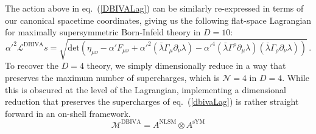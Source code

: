 \documentclass[12pt,letter]{article}
\def\eqn#1{eq.~(\ref{#1})}
\def\be{\begin{equation}}
\def\ee{\end{equation}}
\begin{document}
The action above in \eqn{DBIVALag} can be similarly re-expressed in terms of our canonical spacetime coordinates, giving us the following flat-space Lagrangian for maximally supersymmetric Born-Infeld theory in $D=10$: 
\begin{equation}
 \label{dbivaLag}
    \alpha'^2\mathcal{L}^{\text{DBIVA}}s = \sqrt{\text{det} \left(\eta_{\mu\nu}- \alpha' F_{\mu\nu} + \alpha'^2 (\bar{\lambda} \Gamma_\mu \partial_\nu \lambda)- \alpha'^4(\bar{\lambda} \Gamma^\rho \partial_\mu \lambda )(\bar{\lambda} \Gamma_\rho \partial_\nu \lambda) \right)}
  \,.
\end{equation}
To recover the $D=4$ theory, we simply dimensionally reduce in a way that preserves the maximum number of supercharges, which is $\mathcal{N}=4$ in $D=4$. While this is obscured at the level of the Lagrangian, implementing a dimensional reduction that preserves the supercharges of \eqn{dbivaLag} is rather straight forward in an on-shell framework. 
\be
\mathcal{M}^{\text{DBIVA}} = A^{\text{NLSM}} \otimes A^{\text{sYM}}
\ee
\end{document}
